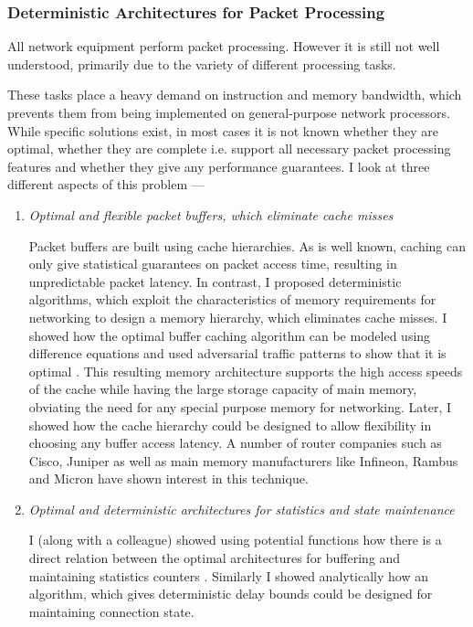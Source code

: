 \documentclass[a4paper, 10pt]{article}
\begin{document}
\begin{small}
\subsubsection*{\small Deterministic Architectures for Packet Processing}

All network equipment perform packet processing. However 
it is still not well understood, primarily due to the variety of
different processing tasks.

These tasks place a heavy demand on instruction and memory bandwidth, which 
prevents them from being implemented on general-purpose network processors.
While specific solutions exist, in most cases it is not known whether they
are optimal, whether they are complete i.e. support all necessary packet processing features and whether they
give any performance guarantees. I look at three different aspects of this problem ---

\begin{enumerate}

\item {\em Optimal and flexible packet buffers, which eliminate cache misses}

Packet buffers are built using cache hierarchies. As is well known, caching
can only give statistical guarantees on packet access time, resulting in unpredictable packet
latency.
In contrast, I proposed deterministic algorithms, which exploit the characteristics 
of memory requirements for networking to design a memory hierarchy, which eliminates cache misses. 
I showed how the optimal buffer caching algorithm can be modeled using difference equations and
used adversarial traffic patterns to show that it is optimal \cite{buffer}.
This resulting memory architecture supports the high access speeds of the cache while
having the large storage capacity of main memory, obviating the need for any special purpose memory
for networking.
Later, I showed how the cache hierarchy could be designed to allow 
flexibility in choosing any buffer access latency.
A number of router companies such as Cisco, Juniper as well as main memory manufacturers 
like Infineon, Rambus and Micron have shown interest in this technique.

\item {\em Optimal and deterministic architectures for statistics and state maintenance}

I (along with a colleague) showed using potential functions how there is 
a direct relation between the optimal architectures for buffering
and maintaining statistics counters \cite{stats}. 
Similarly I showed analytically how an algorithm, which gives deterministic 
delay bounds could be designed for maintaining connection state. 


\end{enumerate}
\end{small}
\end{document}
